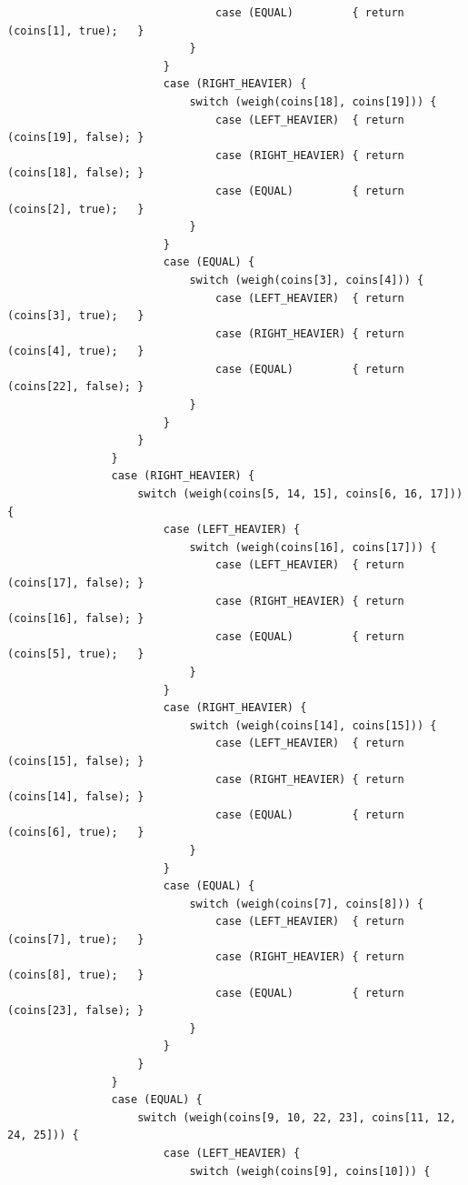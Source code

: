 \documentclass[answers]{exam}
\begin{document}
\begin{questions}
\begin{parts}
\begin{solution}
\begin{small}
\begin{verbatim}
                                case (EQUAL)         { return (coins[1], true);   }
                            }
                        }
                        case (RIGHT_HEAVIER) {
                            switch (weigh(coins[18], coins[19])) {
                                case (LEFT_HEAVIER)  { return (coins[19], false); }
                                case (RIGHT_HEAVIER) { return (coins[18], false); }
                                case (EQUAL)         { return (coins[2], true);   }
                            }
                        }
                        case (EQUAL) {
                            switch (weigh(coins[3], coins[4])) {
                                case (LEFT_HEAVIER)  { return (coins[3], true);   }
                                case (RIGHT_HEAVIER) { return (coins[4], true);   }
                                case (EQUAL)         { return (coins[22], false); }
                            }
                        }
                    }
                }
                case (RIGHT_HEAVIER) {
                    switch (weigh(coins[5, 14, 15], coins[6, 16, 17])) {
                        case (LEFT_HEAVIER) {
                            switch (weigh(coins[16], coins[17])) {
                                case (LEFT_HEAVIER)  { return (coins[17], false); }
                                case (RIGHT_HEAVIER) { return (coins[16], false); }
                                case (EQUAL)         { return (coins[5], true);   }
                            }
                        }
                        case (RIGHT_HEAVIER) {
                            switch (weigh(coins[14], coins[15])) {
                                case (LEFT_HEAVIER)  { return (coins[15], false); }
                                case (RIGHT_HEAVIER) { return (coins[14], false); }
                                case (EQUAL)         { return (coins[6], true);   }
                            }
                        }
                        case (EQUAL) {
                            switch (weigh(coins[7], coins[8])) {
                                case (LEFT_HEAVIER)  { return (coins[7], true);   }
                                case (RIGHT_HEAVIER) { return (coins[8], true);   }
                                case (EQUAL)         { return (coins[23], false); }
                            }
                        }
                    }
                }
                case (EQUAL) {
                    switch (weigh(coins[9, 10, 22, 23], coins[11, 12, 24, 25])) {
                        case (LEFT_HEAVIER) {
                            switch (weigh(coins[9], coins[10])) {

\end{verbatim}
\end{small}
\end{solution}
\end{parts}
\end{questions}
\end{document}
